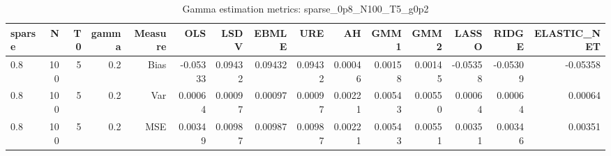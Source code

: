 \begin{table}[!htbp]\centering
\caption{Gamma estimation metrics: sparse_0p8_N100_T5_g0p2}
\label{tab:table1_sparse_0p8_N100_T5_g0p2}
\begin{tabular}{lrrrrrrrrrrrrrr}
\hline
sparse & N & T0 & gamma & Measure & OLS & LSDV & EBMLE & URE & AH & GMM1 & GMM2 & LASSO & RIDGE & ELASTIC_NET \\
\hline
0.8 & 100 & 5 & 0.2 & Bias & -0.05333 & 0.09432 & 0.09432 & 0.09432 & 0.00046 & 0.00158 & 0.00145 & -0.05358 & -0.05309 & -0.05358 \\
0.8 & 100 & 5 & 0.2 & Var & 0.00064 & 0.00097 & 0.00097 & 0.00097 & 0.00221 & 0.00543 & 0.00550 & 0.00064 & 0.00064 & 0.00064 \\
0.8 & 100 & 5 & 0.2 & MSE & 0.00349 & 0.00987 & 0.00987 & 0.00987 & 0.00221 & 0.00543 & 0.00551 & 0.00351 & 0.00346 & 0.00351 \\
\hline
\end{tabular}
\end{table}

